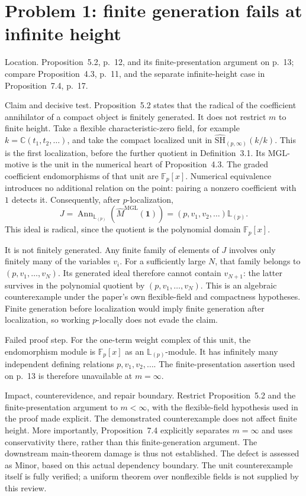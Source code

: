 \documentclass[10pt]{article}
\begin{document}
\section*{Problem 1: finite generation fails at infinite height}
Location. Proposition 5.2, p. 12, and its finite-presentation argument on p. 13; compare Proposition 4.3, p. 11, and the separate infinite-height case in Proposition 7.4, p. 17.\par
Claim and decisive test. Proposition 5.2 states that the radical of the coefficient annihilator of a compact object is finitely generated. It does not restrict \(m\) to finite height. Take a flexible characteristic-zero field, for example \(k=\mathbb C(t_1,t_2,\ldots)\), and take the compact localized unit in \(\widehat{\mathrm{SH}}_{(p,\infty)}(k/k)\). This is the first localization, before the further quotient in Definition 3.1. Its \(\mathrm{MGL}\)-motive is the unit in the numerical heart of Proposition 4.3. The graded coefficient endomorphisms of that unit are \(\mathbb F_p[x]\). Numerical equivalence introduces no additional relation on the point: pairing a nonzero coefficient with \(1\) detects it. Consequently, after \(p\)-localization, \[J=\operatorname{Ann}_{\mathbb L_{(p)}}(\widehat M^{\mathrm{MGL}}(\mathbf1))
   =(p,v_1,v_2,\ldots)\mathbb L_{(p)} .\] This ideal is radical, since the quotient is the polynomial domain \(\mathbb F_p[x]\).\par
It is not finitely generated. Any finite family of elements of \(J\) involves only finitely many of the variables \(v_i\). For a sufficiently large \(N\), that family belongs to \((p,v_1,\ldots,v_N)\). Its generated ideal therefore cannot contain \(v_{N+1}\): the latter survives in the polynomial quotient by \((p,v_1,\ldots,v_N)\). This is an algebraic counterexample under the paper’s own flexible-field and compactness hypotheses. Finite generation before localization would imply finite generation after localization, so working \(p\)-locally does not evade the claim.\par
Failed proof step. For the one-term weight complex of this unit, the endomorphism module is \(\mathbb F_p[x]\) as an \(\mathbb L_{(p)}\)-module. It has infinitely many independent defining relations \(p,v_1,v_2,\ldots\). The finite-presentation assertion used on p. 13 is therefore unavailable at \(m=\infty\).\par
Impact, counterevidence, and repair boundary. Restrict Proposition 5.2 and the finite-presentation argument to \(m<\infty\), with the flexible-field hypothesis used in the proof made explicit. The demonstrated counterexample does not affect finite height. More importantly, Proposition 7.4 explicitly separates \(m=\infty\) and uses conservativity there, rather than this finite-generation argument. The downstream main-theorem damage is thus not established. The defect is assessed as Minor, based on this actual dependency boundary. The unit counterexample itself is fully verified; a uniform theorem over nonflexible fields is not supplied by this review.\par
\end{document}
